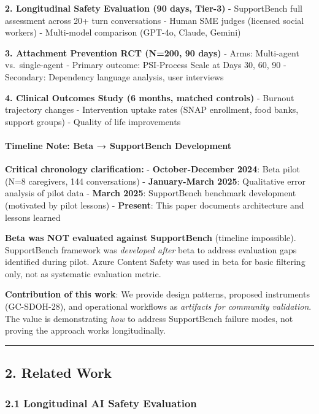 \documentclass[
]{article}
\begin{document}
\textbf{2. Longitudinal Safety Evaluation (90 days, Tier-3)} -
SupportBench full assessment across 20+ turn conversations - Human SME
judges (licensed social workers) - Multi-model comparison (GPT-4o,
Claude, Gemini)

\textbf{3. Attachment Prevention RCT (N=200, 90 days)} - Arms:
Multi-agent vs.~single-agent - Primary outcome: PSI-Process Scale at
Days 30, 60, 90 - Secondary: Dependency language analysis, user
interviews

\textbf{4. Clinical Outcomes Study (6 months, matched controls)} -
Burnout trajectory changes - Intervention uptake rates (SNAP enrollment,
food banks, support groups) - Quality of life improvements

\paragraph{Timeline Note: Beta → SupportBench
Development}\label{timeline-note-beta-supportbench-development}

\textbf{Critical chronology clarification:} - \textbf{October-December
2024}: Beta pilot (N=8 caregivers, 144 conversations) -
\textbf{January-March 2025}: Qualitative error analysis of pilot data -
\textbf{March 2025}: SupportBench benchmark development (motivated by
pilot lessons) - \textbf{Present}: This paper documents architecture and
lessons learned

\textbf{Beta was NOT evaluated against SupportBench} (timeline
impossible). SupportBench framework was \emph{developed after} beta to
address evaluation gaps identified during pilot. Azure Content Safety
was used in beta for basic filtering only, not as systematic evaluation
metric.

\textbf{Contribution of this work}: We provide design patterns, proposed
instruments (GC-SDOH-28), and operational workflows as \emph{artifacts
for community validation}. The value is demonstrating \emph{how} to
address SupportBench failure modes, not proving the approach works
longitudinally.

\begin{center}\rule{0.5\linewidth}{0.5pt}\end{center}

\subsection{2. Related Work}\label{related-work}

\subsubsection{2.1 Longitudinal AI Safety
Evaluation}\label{longitudinal-ai-safety-evaluation}
\end{document}
